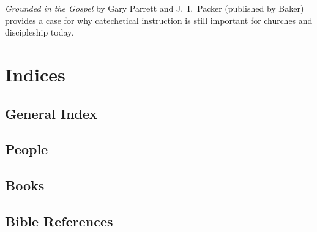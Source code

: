 \documentclass[]{memoir}
\begin{document}
\emph{Grounded in the Gospel}\/ by Gary Parrett and J.~I.\ Packer (published by Baker) provides a case for why catechetical instruction is still important for churches and discipleship today.


\backmatter

\chapter{Indices}

\section{General Index}
\vspace{-3em}\renewcommand\indexname{}
\printindex

\section{People}

\vspace{-3em}\renewcommand\indexname{}
\printindex[people]

\section{Books}

\vspace{-3em}\renewcommand\indexname{}
\printindex[book]

\section{Bible References}

\printindex[gen]

\printindex[exo]

\printindex[lev]

\printindex[num]

\printindex[deu]

\printindex[jos]

\printindex[jdg]

\printindex[rut]

\printindex[1sa]

\printindex[2sa]

\printindex[1ki]

\printindex[2ki]
\end{document}
